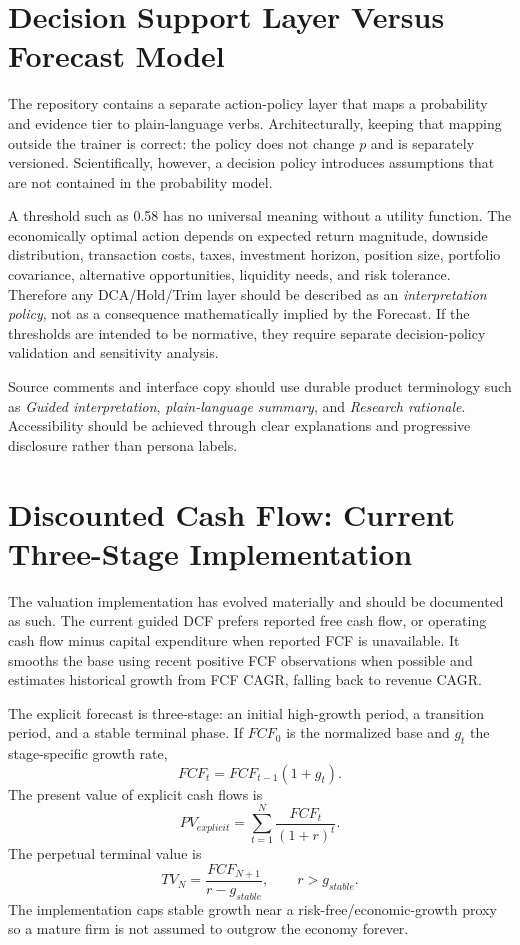 \documentclass[11pt]{article}
\begin{document}
\section{Decision Support Layer Versus Forecast Model}
The repository contains a separate action-policy layer that maps a probability and evidence tier to plain-language verbs. Architecturally, keeping that mapping outside the trainer is correct: the policy does not change $p$ and is separately versioned. Scientifically, however, a decision policy introduces assumptions that are not contained in the probability model.

A threshold such as 0.58 has no universal meaning without a utility function. The economically optimal action depends on expected return magnitude, downside distribution, transaction costs, taxes, investment horizon, position size, portfolio covariance, alternative opportunities, liquidity needs, and risk tolerance. Therefore any DCA/Hold/Trim layer should be described as an \emph{interpretation policy}, not as a consequence mathematically implied by the Forecast. If the thresholds are intended to be normative, they require separate decision-policy validation and sensitivity analysis.

Source comments and interface copy should use durable product terminology such as \emph{Guided interpretation}, \emph{plain-language summary}, and \emph{Research rationale}. Accessibility should be achieved through clear explanations and progressive disclosure rather than persona labels.

\section{Discounted Cash Flow: Current Three-Stage Implementation}
The valuation implementation has evolved materially and should be documented as such. The current guided DCF prefers reported free cash flow, or operating cash flow minus capital expenditure when reported FCF is unavailable. It smooths the base using recent positive FCF observations when possible and estimates historical growth from FCF CAGR, falling back to revenue CAGR.

The explicit forecast is three-stage: an initial high-growth period, a transition period, and a stable terminal phase. If $FCF_0$ is the normalized base and $g_t$ the stage-specific growth rate,
\begin{equation}
FCF_t=FCF_{t-1}(1+g_t).
\end{equation}
The present value of explicit cash flows is
\begin{equation}
PV_{explicit}=\sum_{t=1}^{N}\frac{FCF_t}{(1+r)^t}.
\end{equation}
The perpetual terminal value is
\begin{equation}
TV_N=\frac{FCF_{N+1}}{r-g_{stable}},\qquad r>g_{stable}.
\end{equation}
The implementation caps stable growth near a risk-free/economic-growth proxy so a mature firm is not assumed to outgrow the economy forever.
\end{document}
